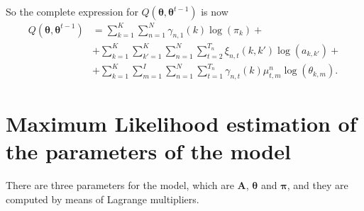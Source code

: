 \documentclass[12pt]{article}
\newcommand{\bs}{\boldsymbol}
\begin{document}
So the complete expression for $Q \left( \boldsymbol { \theta } , \boldsymbol { \theta } ^ { t - 1 } \right)$ is now
\begin{equation}
\begin{split}
Q \left( \boldsymbol { \theta } , \boldsymbol { \theta } ^ { t - 1 } \right) &= \sum\limits_{k=1}^{K}\sum _ { n = 1 } ^ { N } \gamma _ { n , 1 } ( k ) \log(\pi_{k}) + \\
&+ \sum\limits_{k=1}^{K}\sum\limits_{k'=1}^{K}\sum _ { n = 1 } ^ { N } \sum _ { t = 2 } ^ { T _ { n } } \xi _ { n , t } ( k , k' ) \log(a_{k,k'}) + \\
&+ \sum\limits_{k=1}^{K}\sum\limits_{m=1}^{I}\sum _ { n = 1 } ^ { N } \sum _ { t = 1 } ^ { T _ { n } } \gamma _ { n , t } ( k )\mu^{n}_{t,m} \log(\theta_{k,m}).
\end{split}
\end{equation}
\section{Maximum Likelihood estimation of the parameters of the model}
There are three parameters for the model, which are $\mathbf{A}$, $\bs\theta$ and $\bs\pi$, and they are computed by means of Lagrange multipliers.
\end{document}

